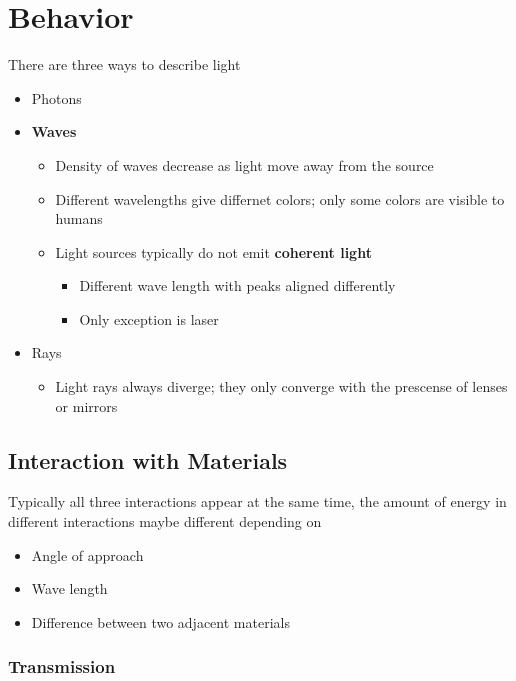 \section{Behavior}

There are three ways to describe light

\begin{itemize}
  \item Photons
  \item \textbf{Waves}
  \begin{itemize}
    \item Density of waves decrease as light move away from the source
    \item Different wavelengths give differnet colors; only some colors
    are visible to humans
    \item Light sources typically do not emit \textbf{coherent light}
    \begin{itemize}
      \item Different wave length with peaks aligned differently
      \item Only exception is laser
    \end{itemize}
  \end{itemize}

  \item Rays
  \begin{itemize}
    \item Light rays always diverge; they only converge with the prescense
    of lenses or mirrors
  \end{itemize}
\end{itemize}

\subsection{Interaction with Materials}

  Typically all three interactions appear at the same time, the amount of
  energy in different interactions maybe different depending on

  \begin{itemize}
    \item Angle of approach
    \item Wave length
    \item Difference between two adjacent materials
  \end{itemize}

  \subsubsection{Transmission}

